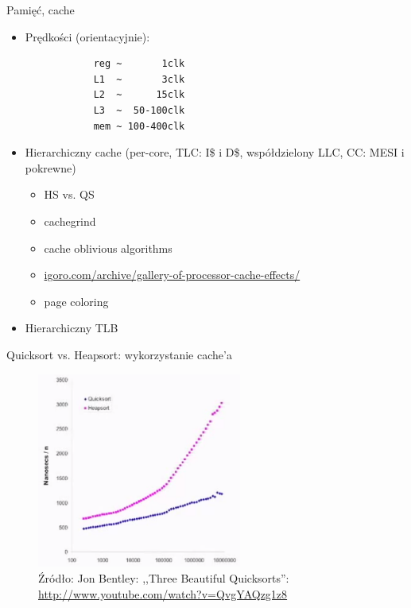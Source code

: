 \begin{frame}[fragile]{Pamięć, cache}
	\begin{itemize}
		\item Prędkości (orientacyjnie):
		\begin{verbatim}
			reg ~       1clk
			L1  ~       3clk
			L2  ~      15clk
			L3  ~  50-100clk
			mem ~ 100-400clk
		\end{verbatim}
		\item Hierarchiczny cache (per-core, TLC: I\$ i D\$, współdzielony LLC, CC: MESI i pokrewne)
		\begin{itemize}
			\item HS vs. QS
			\item cachegrind
			\item cache oblivious algorithms
			\item \url{igoro.com/archive/gallery-of-processor-cache-effects/}
			\item page coloring
		\end{itemize}
		\item Hierarchiczny TLB
	\end{itemize}
\end{frame}
\begin{frame}{Quicksort vs. Heapsort: wykorzystanie cache'a}
	\begin{figure}[h]
		\includegraphics[width=0.6\textwidth]{gfx/cache_bentley}
		\caption{Źródło: Jon Bentley: ,,Three Beautiful Quicksorts'': \url{http://www.youtube.com/watch?v=QvgYAQzg1z8}}
	\end{figure}
\end{frame}
